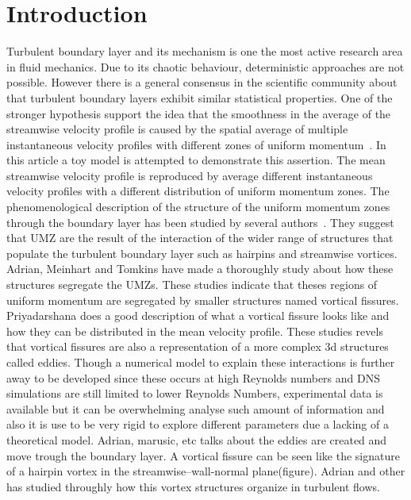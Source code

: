 \documentclass[aps,reprint,amsmath,amssymb,pra]{revtex4-1}%
\begin{document}
\maketitle
\section{\label{sec:intro} Introduction}
Turbulent boundary layer and its mechanism is one the most active research area in fluid mechanics. Due to its chaotic behaviour, deterministic approaches are not possible. However there is a general consensus in the scientific community about that turbulent boundary layers exhibit similar statistical properties. One of the stronger hypothesis  support the idea that the smoothness in the average of the streamwise velocity profile is caused by the spatial average of multiple instantaneous velocity profiles with different zones of uniform momentum~\citep{mca1995,umz2015}. In this article a toy model is attempted to demonstrate this assertion. The mean streamwise velocity profile is reproduced by average different instantaneous velocity profiles with a different distribution of uniform momentum zones.
The phenomenological description of the structure of the uniform momentum zones through the boundary layer has been studied by several authors~\citep{nose}. They suggest that UMZ are the result of the interaction of the wider range of structures that populate the turbulent boundary layer\cite{2} such as hairpins and streamwise vortices. \cite{amt2000} Adrian, Meinhart and Tomkins have made a thoroughly  study about how these structures segregate the UMZs.  These studies indicate that theses regions of uniform momentum are segregated by smaller structures named vortical fissures.\citep{priya2007} Priyadarshana does a good description of what a vortical fissure looks like and how they can be distributed in the mean velocity profile. These studies revels that  vortical fissures are also a representation of a more complex 3d structures called eddies. Though a numerical model to explain these interactions is further away to be developed since these occurs at high Reynolds numbers and DNS simulations are still limited to lower Reynolds Numbers, experimental data is available but it can be overwhelming analyse such amount of information and also it is use to be very rigid to explore different parameters due a lacking of a theoretical model.
 Adrian, marusic, etc talks about the eddies are created and move trough the boundary layer. A vortical fissure can be seen like the signature of a hairpin vortex in the streamwise–wall-normal plane(figure). \cite{amt2000} Adrian and other has studied throughly how this vortex structures organize in turbulent flows. 
\end{document}
